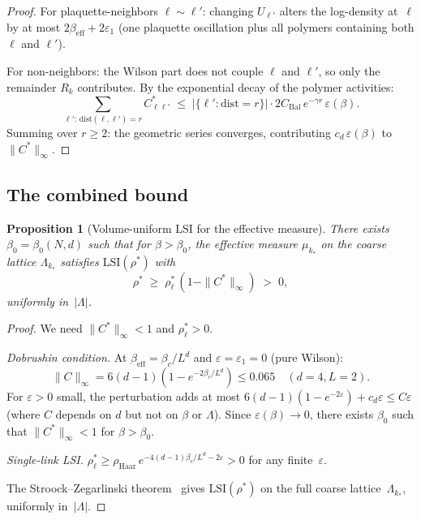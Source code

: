 \documentclass[11pt]{article}
\newtheorem{proposition}[theorem]{Proposition}
\theoremstyle{definition}
\theoremstyle{remark}
\newcommand{\LSI}{\mathrm{LSI}}
\newcommand{\Haar}{\mathrm{Haar}}
\newcommand{\dist}{\mathrm{dist}}
\begin{document}
\begin{proof}
For plaquette-neighbors $\ell \sim \ell'$: changing $U_{\ell'}$ 
alters the log-density at~$\ell$ by at most 
$2\beta_{\mathrm{eff}} + 2\varepsilon_1$ (one plaquette 
oscillation plus all polymers containing both $\ell$ and $\ell'$).

For non-neighbors: the Wilson part does not couple $\ell$ and 
$\ell'$, so only the remainder $R_k$ contributes.  By the 
exponential decay of the polymer activities:
\[
  \sum_{\ell':\,\dist(\ell,\ell')=r} C^*_{\ell\ell'} 
  \;\leq\; |\{\ell':\dist=r\}| \cdot 2C_{\mathrm{Bal}}\,e^{-\gamma r}\,
  \varepsilon(\beta).
\]
Summing over $r \geq 2$: the geometric series converges, contributing 
$c_d \,\varepsilon(\beta)$ to $\|C^*\|_\infty$.
\end{proof}

\subsection{The combined bound}

\begin{proposition}[Volume-uniform LSI for the effective measure]
\label{prop:combined}
There exists $\beta_0 = \beta_0(N,d)$ such that for $\beta > \beta_0$, 
the effective measure $\mu_{k_*}$ on the coarse lattice 
$\Lambda_{k_*}$ satisfies $\LSI(\rho^*)$ with
\begin{equation}\label{eq:rho_star}
  \rho^* \;\geq\; \rho_\ell^*\,(1 - \|C^*\|_\infty) \;>\; 0,
\end{equation}
uniformly in~$|\Lambda|$.
\end{proposition}

\begin{proof}
We need $\|C^*\|_\infty < 1$ and $\rho_\ell^* > 0$.

\emph{Dobrushin condition.}  
At $\beta_{\mathrm{eff}} = \beta_c/L^d$ and 
$\varepsilon = \varepsilon_1 = 0$ (pure Wilson):
\[
  \|C\|_\infty = 
  6(d-1)(1-e^{-2\beta_c/L^d}) \leq 0.065 \quad (d=4, L=2).
\]
For $\varepsilon > 0$ small, the perturbation adds at most 
$6(d-1)(1-e^{-2\varepsilon}) + c_d\varepsilon \leq C\varepsilon$ 
(where $C$ depends on $d$ but not on $\beta$ or $\Lambda$).  
Since $\varepsilon(\beta) \to 0$, there exists $\beta_0$ such that 
$\|C^*\|_\infty < 1$ for $\beta > \beta_0$.

\emph{Single-link LSI.}  
$\rho_\ell^* \geq \rho_{\Haar}\,e^{-4(d-1)\beta_c/L^d - 2\varepsilon} > 0$ 
for any finite~$\varepsilon$.

The Stroock--Zegarlinski theorem~\cite{SZ92} gives 
$\LSI(\rho^*)$ on the full coarse lattice~$\Lambda_{k_*}$, 
uniformly in~$|\Lambda|$.
\end{proof}
\end{document}

